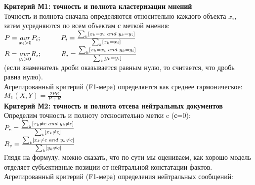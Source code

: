 \documentclass{article}
\begin{document}
\textbf{Критерий М1: точность и полнота кластеризации мнений}\\
Точность и полнота сначала определяются относительно каждого объекта $x_i$, затем усредняются по всем объектам с меткой мнения:\\

\hspace{4cm}$P =  \underset{x_i>0}{avr}P_i; \hspace{1cm} P_i = \frac{\sum_{k} [x_k=x_i \hspace{0.1cm} and \hspace{0.1cm} y_k=y_i]}{\sum_{k} [x_k=x_i]}$\\

\hspace{3.5cm}$R = \underset{y_i>0}{avr}R_i; \hspace{1cm} R_i = \frac{\sum_{k} [x_k=x_i \hspace{0.1cm} and \hspace{0.1cm} y_k=y_i]}{\sum_{k} [y_k=y_i]}$\\

(если знаменатель дроби оказывается равным нулю, то считается, что дробь равна нулю).\\
Агрегированный критерий (F1-мера) определяется как среднее гармоническое:\\ 

\hspace{5cm}$M_1(X, Y) = \frac{2PR}{P+R}$\\

\textbf{Критерий М2: точность и полнота отсева нейтральных документов}\\
Определим точность и полноту отсносительно метки c (с=0):\\

\hspace{5cm}$P_c = \frac{\sum_{k} [x_k \neq c \hspace{0.1cm} and \hspace{0.1cm} y_k \neq c]}{\sum_{k} [x_k \neq c]}$\\

\hspace{5cm}$R_c = \frac{\sum_{k} [x_k \neq c \hspace{0.1cm} and \hspace{0.1cm} y_k \neq c]}{\sum_{k} [y_k \neq c]}$\\

Глядя на формулу, можно сказать, что по сути мы оцениваем, как хорошо модель отделяет субъективные позиции от нейтральной констатации фактов.
Агрегированный критерий (F1-мера) определения нейтральных сообщений:\\ 
\end{document}
